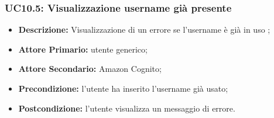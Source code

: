 \subsubsection{UC10.5: Visualizzazione username già presente}
\label{sec:UC10.5}
\begin{itemize}
    \item \textbf{Descrizione:} Visualizzazione di un errore se l'username è già in uso ;
    \item \textbf{Attore Primario:} utente generico;
    \item \textbf{Attore Secondario:} Amazon Cognito;
    \item \textbf{Precondizione:} l'utente ha inserito l'username già usato;
    \item \textbf{Postcondizione:} l'utente visualizza un messaggio di errore. 
\end{itemize}